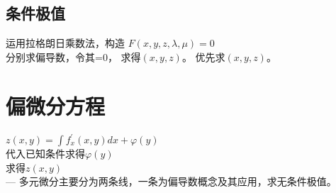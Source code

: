 \subsection{条件极值}
运用拉格朗日乘数法，构造
$F(x, y, z, \lambda, \mu) = 0$ \\
分别求偏导数，令其=0， 求得$(x, y, z)$。
优先求$(x, y, z)$。 

\section{偏微分方程}

$z(x,y) = \int f_x^{'}(x,y) dx + \varphi(y)$ \\
代入已知条件求得$\varphi(y)$ \\
求得$z(x,y)$ \\

---
多元微分主要分为两条线，一条为偏导数概念及其应用，求无条件极值。
